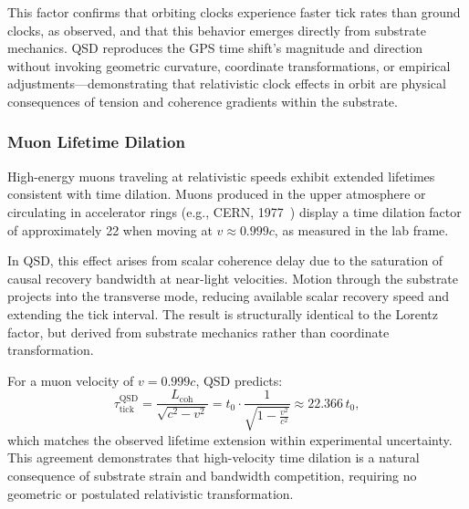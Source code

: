 \documentclass[entropy,article,submit,pdftex,moreauthors]{Definitions/mdpi}
\begin{document}
This factor confirms that orbiting clocks experience faster tick rates than ground clocks, as observed, and that this behavior emerges directly from substrate mechanics. QSD reproduces the GPS time shift's magnitude and direction without invoking geometric curvature, coordinate transformations, or empirical adjustments—demonstrating that relativistic clock effects in orbit are physical consequences of tension and coherence gradients within the substrate.

\subsubsection{Muon Lifetime Dilation}

High-energy muons traveling at relativistic speeds exhibit extended lifetimes consistent with time dilation. Muons produced in the upper atmosphere or circulating in accelerator rings (e.g., CERN, 1977~\cite{bailey-muon}) display a time dilation factor of approximately 22 when moving at \( v \approx 0.999c \), as measured in the lab frame.

In QSD, this effect arises from scalar coherence delay due to the saturation of causal recovery bandwidth at near-light velocities. Motion through the substrate projects into the transverse mode, reducing available scalar recovery speed and extending the tick interval. The result is structurally identical to the Lorentz factor, but derived from substrate mechanics rather than coordinate transformation.

For a muon velocity of \( v = 0.999c \), QSD predicts:
\[
\tau_{\text{tick}}^{\text{QSD}} = \frac{L_{\text{coh}}}{\sqrt{c^2 - v^2}} = t_0 \cdot \frac{1}{\sqrt{1 - \frac{v^2}{c^2}}} \approx 22.366 \, t_0,
\]
which matches the observed lifetime extension within experimental uncertainty. This agreement demonstrates that high-velocity time dilation is a natural consequence of substrate strain and bandwidth competition, requiring no geometric or postulated relativistic transformation.
\end{document}
